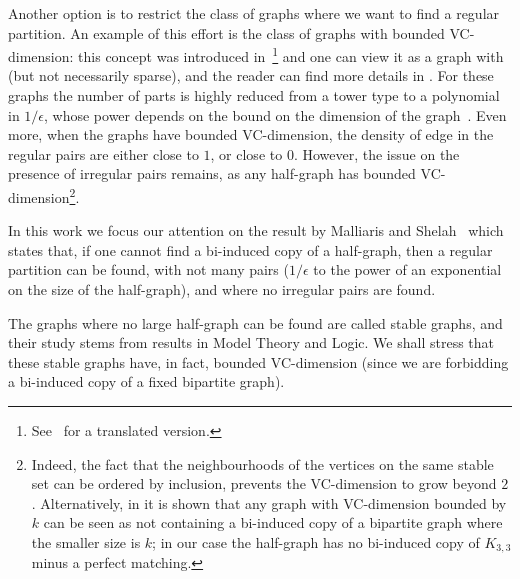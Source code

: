     Another option is to restrict the class of graphs where we want to find a regular partition.
    An example of this effort is the class of graphs with bounded VC-dimension: this concept was introduced
    in~\cite{the_uniform_convergence_of_frequencies_of_the_appearance_of_events_to_their_probabilities}\footnote{
        See~\cite{on_the_uniform_convergence_of_relative_frequencies_of_events_to_their_probabilities}
        for a translated version.}
    and one can view it as a graph with  (but not necessarily sparse), and the reader can find more
    details in .
    For these graphs the number of parts is highly reduced from a tower type to a polynomial in $1/\epsilon$, whose
    power depends on the bound on the dimension of the graph~\cite{regularity_partitions_and_the_topology_of_graphons,
        erdos_hajnal_conjecture_for_graphs_with_bounded_vc_dimension,
        efficient_testing_of_bipartite_graphs_for_forbidden_induced_subgraphs}.
    Even more, when the graphs have bounded VC-dimension, the density of edge in the regular pairs are either close to $1$,
    or close to $0$.
    However, the issue on the presence of irregular pairs remains, as any half-graph has bounded VC-dimension\footnote{
        Indeed, the fact that the neighbourhoods of the vertices on the same stable set can be ordered by inclusion,
        prevents the VC-dimension to grow beyond $2$.
        Alternatively, in \cite{regularity_partitions_and_the_topology_of_graphons} it is shown that any graph with
        VC-dimension bounded by $k$ can be seen as not containing a bi-induced copy of a bipartite graph where the
        smaller size is $k$; in our case the half-graph has no bi-induced copy of $K_{3,3}$ minus a perfect matching.}.

    In this work we focus our attention on the result by Malliaris and Shelah~\cite{regularity_lemmas_for_stable_graphs,
        notes_on_the_stable_regularity_lemma}
    which states that, if one cannot find a bi-induced copy of a half-graph, then a regular partition can be found, with
    not many pairs ($1/\epsilon$ to the power of an exponential on the size of the half-graph), and where no irregular
    pairs are found.

    The graphs where no large half-graph can be found are called stable graphs, and their study stems from results in
    Model Theory and Logic.
    We shall stress that these stable graphs have, in fact, bounded VC-dimension (since we are forbidding a bi-induced
    copy of a fixed bipartite graph).

